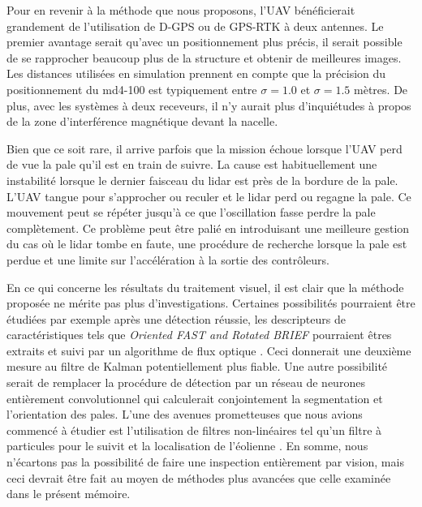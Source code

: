 Pour en revenir à la méthode que nous proposons, l'UAV bénéficierait grandement de l'utilisation de D-GPS ou de GPS-RTK à deux antennes. Le premier avantage serait qu’avec un positionnement plus précis, il serait possible de se rapprocher beaucoup plus de la structure et obtenir de meilleures images. Les distances utilisées en simulation prennent en compte que la précision du positionnement du md4-100 est typiquement entre $\sigma = 1.0$ et $\sigma = 1.5$ mètres. De plus, avec les systèmes à deux receveurs, il n'y aurait plus d'inquiétudes à propos de la zone d'interférence magnétique devant la nacelle.

Bien que ce soit rare, il arrive parfois que la mission échoue lorsque l'UAV perd de vue la pale qu'il est en train de suivre. La cause est habituellement une instabilité lorsque le dernier faisceau du lidar est près de la bordure de la pale. L'UAV tangue pour s'approcher ou reculer et le lidar perd ou regagne la pale. Ce mouvement peut se répéter jusqu'à ce que l'oscillation fasse perdre la pale complètement. Ce problème peut être palié en introduisant une meilleure gestion du cas où le lidar tombe en faute, une procédure de recherche lorsque la pale est perdue et une limite sur l'accélération à la sortie des contrôleurs.

En ce qui concerne les résultats du traitement visuel, il est clair que la méthode proposée ne mérite pas plus d'investigations. Certaines possibilités pourraient être étudiées par exemple après une détection réussie, les descripteurs de caractéristiques tels que \textit{Oriented FAST and Rotated BRIEF} \citep{Rublee2011} pourraient êtres extraits et suivi par un algorithme de flux optique \citep{Lucas1981}. Ceci donnerait une deuxième mesure au filtre de Kalman potentiellement plus fiable. Une autre possibilité serait de remplacer la procédure de détection par un réseau de neurones entièrement convolutionnel qui calculerait conjointement la segmentation et l'orientation des pales. L'une des avenues prometteuses que nous avions commencé à étudier est l'utilisation de filtres non-linéaires tel qu'un filtre à particules pour le suivit et la localisation de l'éolienne \citep{Sugandi2009}. En somme, nous n'écartons pas la possibilité de faire une inspection entièrement par vision, mais ceci devrait être fait au moyen de méthodes plus avancées que celle examinée dans le présent mémoire.

